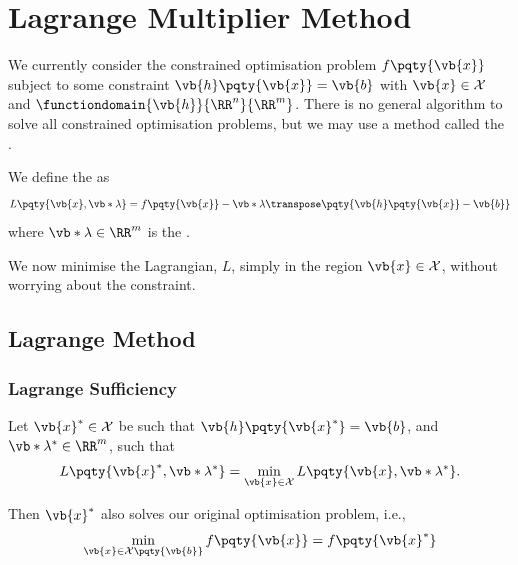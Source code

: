 \section{Lagrange Multiplier Method}

We currently consider the constrained optimisation problem \(f\pqty{\vb{x}}\) subject to some constraint \(\vb{h}\pqty{\vb{x}} = \vb{b}\) with \(\vb{x} \in \mathcal{X}\) and \(\functiondomain{\vb{h}}{\RR^n}{\RR^m}\). There is no general algorithm to solve all constrained optimisation problems, but we may use a method called the .

\begin{definition}
    We define the  as
    \[
        L \pqty{\vb{x}, \vb*{\lambda}} = f\pqty{\vb{x}} - \vb*{\lambda}\transpose \pqty{\vb{h}\pqty{\vb{x}} - \vb{b}}
    \]
    where \(\vb*{\lambda} \in \RR^m\) is the .
\end{definition}

We now minimise the Lagrangian, \(L\), simply in the region \(\vb{x} \in \mathcal{X}\), without worrying about the constraint.

\subsection{Lagrange Method}
\subsubsection{Lagrange Sufficiency}

\begin{theorem}
    \label{thm:lagrange-sufficiency}%
    Let \(\vb{x}^{\ast} \in \mathcal{X}\) be such that \(\vb{h}\pqty{\vb{x}^{\ast}} = \vb{b}\), and \(\vb*{\lambda}^{\ast} \in \RR^m\), such that
    \[
        L\pqty{\vb{x}^{\ast}, \vb*{\lambda}^{\ast}} = \min_{\vb{x} \in \mathcal{X}} L\pqty{\vb{x}, \vb*{\lambda}^{\ast}}.
    \]

    Then \(\vb{x}^{\ast}\) also solves our original optimisation problem, i.e.,
    \[
        \min_{\vb{x} \in \mathcal{X} \pqty{\vb{b}}} f\pqty{\vb{x}} = f\pqty{\vb{x}^{\ast}}
    \]
\end{theorem}

